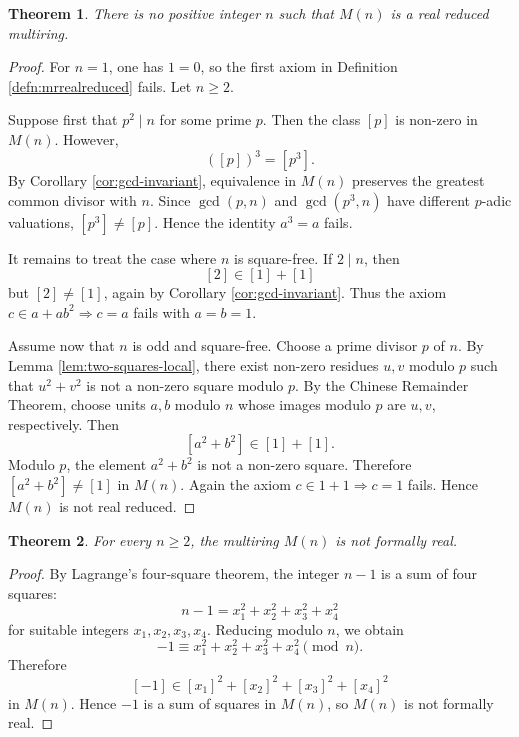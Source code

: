 \documentclass[a4paper,10pt]{article}
\newtheorem{teo}{Theorem}[section]
\newcommand{\cl}[1]{\left[#1\right]}
\begin{document}
\begin{teo}\label{teo:not-real-reduced}
There is no positive integer $n$ such that $M(n)$ is a real reduced multiring.
\end{teo}

\begin{proof}
For $n=1$, one has $1=0$, so the first axiom in Definition \ref{defn:mrrealreduced} fails.  Let $n\ge2$.

Suppose first that $p^2\mid n$ for some prime $p$.  Then the class $\cl p$ is non-zero in $M(n)$.  However,
\[
        (\cl p)^3=\cl{p^3}.
\]
By Corollary \ref{cor:gcd-invariant}, equivalence in $M(n)$ preserves the greatest common divisor with $n$.  Since $\gcd(p,n)$ and $\gcd(p^3,n)$ have different $p$-adic valuations, $\cl{p^3}\ne\cl p$.  Hence the identity $a^3=a$ fails.

It remains to treat the case where $n$ is square-free.  If $2\mid n$, then
\[
        \cl2\in\cl1+\cl1
\]
but $\cl2\ne\cl1$, again by Corollary \ref{cor:gcd-invariant}.  Thus the axiom $c\in a+ab^2\Rightarrow c=a$ fails with $a=b=1$.

Assume now that $n$ is odd and square-free.  Choose a prime divisor $p$ of $n$.  By Lemma \ref{lem:two-squares-local}, there exist non-zero residues $u,v$ modulo $p$ such that $u^2+v^2$ is not a non-zero square modulo $p$.  By the Chinese Remainder Theorem, choose units $a,b$ modulo $n$ whose images modulo $p$ are $u,v$, respectively.  Then
\[
        \cl{a^2+b^2}\in\cl1+\cl1.
\]
Modulo $p$, the element $a^2+b^2$ is not a non-zero square.  Therefore $\cl{a^2+b^2}\ne\cl1$ in $M(n)$.  Again the axiom $c\in1+1\Rightarrow c=1$ fails.  Hence $M(n)$ is not real reduced.
\end{proof}

\begin{teo}\label{teo:not-formally-real}
For every $n\ge2$, the multiring $M(n)$ is not formally real.
\end{teo}

\begin{proof}
By Lagrange's four-square theorem, the integer $n-1$ is a sum of four squares:
\[
        n-1=x_1^2+x_2^2+x_3^2+x_4^2
\]
for suitable integers $x_1,x_2,x_3,x_4$.  Reducing modulo $n$, we obtain
\[
        -1\equiv x_1^2+x_2^2+x_3^2+x_4^2\pmod n.
\]
Therefore
\[
        \cl{-1}\in \cl{x_1}^2+\cl{x_2}^2+\cl{x_3}^2+\cl{x_4}^2
\]
in $M(n)$.  Hence $-1$ is a sum of squares in $M(n)$, so $M(n)$ is not formally real.
\end{proof}
\end{document}

